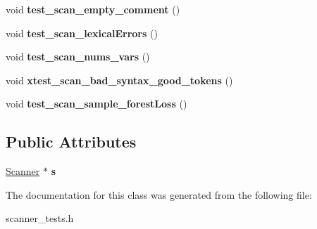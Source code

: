 \begin{DoxyCompactItemize}
\item 
\hypertarget{class_scanner_test_suite_a304719dd961df0714d372010cdf99ef1}{}void {\bfseries test\+\_\+scan\+\_\+empty\+\_\+comment} ()\label{class_scanner_test_suite_a304719dd961df0714d372010cdf99ef1}

\item 
\hypertarget{class_scanner_test_suite_af85168e66ba2b924488aca9768231367}{}void {\bfseries test\+\_\+scan\+\_\+lexical\+Errors} ()\label{class_scanner_test_suite_af85168e66ba2b924488aca9768231367}

\item 
\hypertarget{class_scanner_test_suite_a4bd4d5fc2218f3d28b08b2821ecc271b}{}void {\bfseries test\+\_\+scan\+\_\+nums\+\_\+vars} ()\label{class_scanner_test_suite_a4bd4d5fc2218f3d28b08b2821ecc271b}

\item 
\hypertarget{class_scanner_test_suite_a5b47cd74d93c119b6f64b449fcc379f6}{}void {\bfseries xtest\+\_\+scan\+\_\+bad\+\_\+syntax\+\_\+good\+\_\+tokens} ()\label{class_scanner_test_suite_a5b47cd74d93c119b6f64b449fcc379f6}

\item 
\hypertarget{class_scanner_test_suite_a8248f8bda6c9909971ef13f1364ab8f8}{}void {\bfseries test\+\_\+scan\+\_\+sample\+\_\+forest\+Loss} ()\label{class_scanner_test_suite_a8248f8bda6c9909971ef13f1364ab8f8}

\end{DoxyCompactItemize}
\subsection*{Public Attributes}
\begin{DoxyCompactItemize}
\item 
\hypertarget{class_scanner_test_suite_a39987f3459098101d7c7fb5a4492996d}{}\hyperlink{class_scanner}{Scanner} $\ast$ {\bfseries s}\label{class_scanner_test_suite_a39987f3459098101d7c7fb5a4492996d}

\end{DoxyCompactItemize}


The documentation for this class was generated from the following file\+:\begin{DoxyCompactItemize}
\item 
scanner\+\_\+tests.\+h\end{DoxyCompactItemize}
